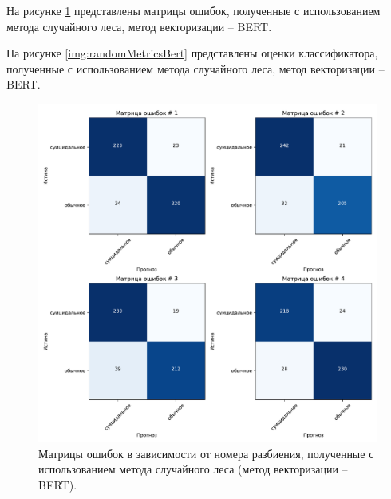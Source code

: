 На рисунке \ref{img:randomMatrBert} представлены матрицы ошибок, полученные с использованием метода случайного леса, метод векторизации -- BERT.

На рисунке \ref{img:randomMetricsBert} представлены оценки классификатора, полученные с использованием метода случайного леса, метод векторизации -- BERT.

\begin{figure}[H]
	\centering
	\includegraphics[width=\textwidth]{inc/plots/randomMatrBert.pdf}
	\caption{ Матрицы ошибок в зависимости от номера разбиения, полученные с использованием метода случайного леса (метод векторизации -- BERT). }
	\label{img:randomMatrBert}
\end{figure}

